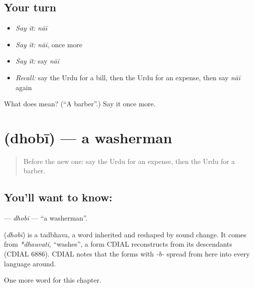 \subsection*{Your turn}
\begin{itemize}
\raggedright
  \item \emph{Say it:} \emph{nāī}
  \item \emph{Say it:} \emph{nāī}, once more
  \item \emph{Say it:} say \emph{nāī}
  \item \emph{Recall:} say the Urdu for a bill, then the Urdu for an expense, then say \emph{nāī} again
\end{itemize}

\begin{tcolorbox}[breakable,colback=teal!4,colframe=teal!35!black,title={Before you move on}]
What does  mean? (\textquotedblleft{}A barber\textquotedblright{}.) Say it once more.
\end{tcolorbox}
\section[\texorpdfstring{\ur{دھوبی} (dhobī)}{دھوبی (dhobī)}]{ (dhobī) — a washerman}

\label{lesson:UR-C210-dhobi}



\begin{quote}
Before the new one: say the Urdu for an expense, then the Urdu for a barber.
\end{quote}

\subsection*{You'll want to know: }
\textbf{} — \emph{dhobī} — \textquotedblleft{}a washerman\textquotedblright{}.

\begin{cousinweb}
\textbf{} (\emph{dhobī}) is a tadbhava, a word inherited and reshaped by sound change. It comes from \emph{*dhauvati}, \textquotedblleft{}washes\textquotedblright{}, a form CDIAL reconstructs from its descendants (CDIAL 6886). CDIAL notes that the forms with \emph{-b-} spread from here into every language around.
\end{cousinweb}

\begin{grammarlens}[title={What you've built}]
One more word for this chapter.
\end{grammarlens}

